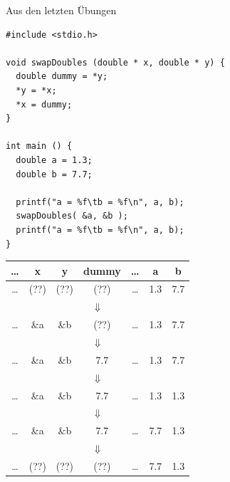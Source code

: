 \begin{frame}[fragile]{Aus den letzten Übungen}
%
\begin{codebox}
\begin{verbatim}
#include <stdio.h>

void swapDoubles (double * x, double * y) {
  double dummy = *y;
  *y = *x;
  *x = dummy;
}

int main () {
  double a = 1.3;
  double b = 7.7;
  
  printf("a = %f\tb = %f\n", a, b);
  swapDoubles( &a, &b );
  printf("a = %f\tb = %f\n", a, b);
}
\end{verbatim}
\end{codebox}
%
\begin{tcolorbox}[title=Speicherbild, valign=center]
\renewcommand{\arraystretch}{1.5}
\tiny
\begin{tabular}{c|c|c|c|c|c|c}
\ldots &   x  &   y  & dummy & \ldots &  a  &  b  \\ \hline
\ldots & (??) & (??) &  (??) & \ldots & 1.3 & 7.7 \\
\multicolumn{7}{c}{$\Downarrow$}\\
\ldots & \&a  & \&b  &  (??) & \ldots & 1.3 & 7.7 \\
\multicolumn{7}{c}{$\Downarrow$}\\
\ldots & \&a  & \&b  &  7.7 & \ldots & 1.3 & 7.7 \\
\multicolumn{7}{c}{$\Downarrow$}\\
\ldots & \&a  & \&b  &  7.7 & \ldots & 1.3 & 1.3 \\
\multicolumn{7}{c}{$\Downarrow$}\\
\ldots & \&a  & \&b  &  7.7 & \ldots & 7.7 & 1.3 \\
\multicolumn{7}{c}{$\Downarrow$}\\
\ldots & (??) & (??) &  (??) & \ldots & 7.7 & 1.3 \\
\end{tabular}
\end{tcolorbox}
%
\end{frame}


